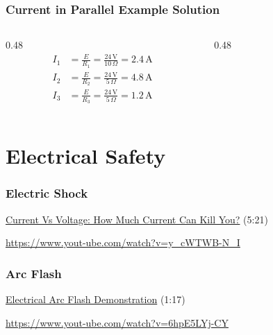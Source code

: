 \begin{frame}
    \frametitle{Current in Parallel Example Solution}

    \begin{columns}
        \begin{column}{0.48\linewidth}
            \[
                \begin{aligned}
                    I_1&=\frac{E}{R_1}=\frac{24\,\text{V}}{10\,\Omega}=2.4\,\text{A}\\
                    I_2&=\frac{E}{R_2}=\frac{24\,\text{V}}{5\,\Omega}=4.8\,\text{A}\\
                    I_3&=\frac{E}{R_3}=\frac{24\,\text{V}}{5\,\Omega}=1.2\,\text{A}
                \end{aligned}
            \]
        \end{column}
        \begin{column}{0.48\linewidth}
            \begin{figure}
                \centering
                \resizebox{\columnwidth}{!}{
                    
                }
            \end{figure}
        \end{column}
	\end{columns}
\end{frame}

\section{Electrical Safety}

\begin{frame}
    \frametitle{Electric Shock}
	\centering
    \href{https://www.yout-ube.com/watch?v=y_cWTWB-N_I}{Current Vs Voltage: How Much Current Can Kill You?} (5:21) 

    {\scriptsize \href{https://www.yout-ube.com/watch?v=y_cWTWB-N_I}{https://www.yout-ube.com/watch?v=y\_cWTWB-N\_I}}
\end{frame}

\begin{frame}
    \frametitle{Arc Flash}
    \centering
	\href{https://www.yout-ube.com/watch?v=6hpE5LYj-CY}{Electrical Arc Flash Demonstration} (1:17) 

    {\scriptsize \href{https://www.yout-ube.com/watch?v=6hpE5LYj-CY}{https://www.yout-ube.com/watch?v=6hpE5LYj-CY}}
\end{frame}

